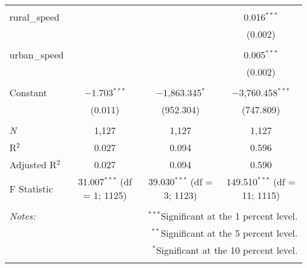 \documentclass{article}
\begin{document}
\begin{table}[!htbp]
\begin{tabular}{@{\extracolsep{5pt}}lccc}
  & & & \\ 
 rural\_speed &  &  & 0.016$^{***}$ \\ 
  &  &  & (0.002) \\ 
  & & & \\ 
 urban\_speed &  &  & 0.005$^{***}$ \\ 
  &  &  & (0.002) \\ 
  & & & \\ 
 Constant & $-$1.703$^{***}$ & $-$1,863.345$^{*}$ & $-$3,760.458$^{***}$ \\ 
  & (0.011) & (952.304) & (747.809) \\ 
  & & & \\ 
\textit{N} & 1,127 & 1,127 & 1,127 \\ 
R$^{2}$ & 0.027 & 0.094 & 0.596 \\ 
Adjusted R$^{2}$ & 0.027 & 0.094 & 0.590 \\ 
F Statistic & 31.007$^{***}$ (df = 1; 1125) & 39.030$^{***}$ (df = 3; 1123) & 149.510$^{***}$ (df = 11; 1115) \\ 
\hline 
\hline \\[-1.8ex] 
\textit{Notes:} & \multicolumn{3}{r}{$^{***}$Significant at the 1 percent level.} \\ 
 & \multicolumn{3}{r}{$^{**}$Significant at the 5 percent level.} \\ 
 & \multicolumn{3}{r}{$^{*}$Significant at the 10 percent level.} \\ 
\normalsize 
\end{tabular} 
\end{table} 
\end{document}
